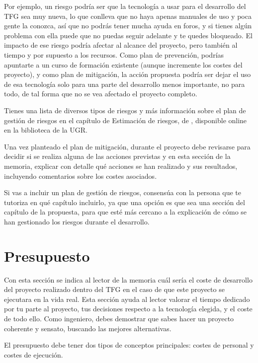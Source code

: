 Por ejemplo, un riesgo podría ser que la tecnología a usar para el desarrollo del TFG sea muy nueva, lo que conlleva que no haya apenas manuales de uso y poca gente la conozca, así que no podrás tener mucha ayuda en foros, y  si tienes algún problema con ella puede que no puedas seguir adelante y te quedes bloqueado. El impacto de ese riesgo podría afectar al alcance del proyecto, pero también al tiempo y por supuesto a los recursos. Como plan de prevención, podrías apuntarte a un curso de formación existente (aunque incremente los costes del proyecto), y como plan de mitigación, la acción propuesta podría ser dejar el uso de esa tecnología solo para una parte del desarrollo menos importante, no para todo, de tal forma que no se vea afectado el proyecto completo.

Tienes una lista de diversos tipos de riesgos y más información sobre el plan de gestión de riesgos en el capítulo de Estimación de riesgos, de \cite{guerin2018gestion}, disponible online en la biblioteca de la UGR.

Una vez planteado el plan de mitigación, durante el proyecto debe revisarse para decidir si se realiza alguna de las acciones previstas y en esta sección de la memoria, explicar con detalle qué acciones se han realizado y sus resultados, incluyendo comentarios sobre los costes asociados.

Si vas a incluir un plan de gestión de riesgos, consensúa con la persona que te tutoriza en qué capítulo incluirlo, ya que una opción es que sea una sección del capítulo de la propuesta, para que esté más cercano a la explicación de  cómo se han gestionado los riesgos durante el desarrollo.

\section{Presupuesto}

Con esta sección se indica al lector de la memoria cuál sería el coste de desarrollo del proyecto realizado dentro del TFG en el caso de que este proyecto se ejecutara en la vida real. Esta sección ayuda al lector valorar el tiempo dedicado por tu parte al proyecto, tus decisiones respecto a la tecnología elegida, y el coste de todo ello. Como ingeniero, debes demostrar que sabes hacer un proyecto coherente  y sensato, buscando las mejores alternativas. 

El presupuesto debe tener dos tipos de conceptos principales: costes de personal y costes de ejecución.

